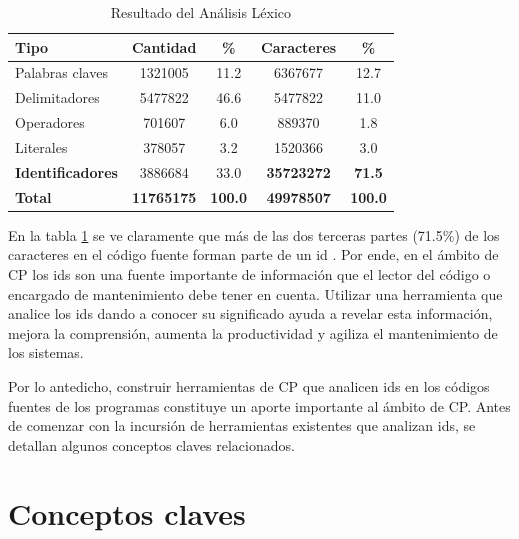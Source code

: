 \documentclass[a4paper,12pt]{report}
\begin{document}
\begin{center}
	\begin{table}[h]
	
		\centering
   		\begin{tabular}{| l | c | c | c | c | }  
       
       \hline
  	   \textsf{Tipo} & \textsf{Cantidad} & \textsf{\%} & \textsf{Caracteres} & \textsf{\%} \\ \hline
  	   Palabras claves & 1321005 & 11.2 & 6367677 & 12.7 \\ \hline
   	   Delimitadores & 5477822 & 46.6 & 5477822 & 11.0 \\ \hline
       Operadores & 701607 & 6.0 & 889370 & 1.8 \\ \hline
       Literales & 378057 & 3.2 & 1520366 & 3.0 \\ \hline          
       \textbf{Identificadores} & 3886684 & 33.0 & \textbf{35723272} & \textbf{71.5} \\ \hline
       \textbf{Total} & \textbf{11765175} & \textbf{100.0} & \textbf{49978507} & \textbf{100.0} \\ \hline
     
   	\end{tabular}  
	   
   \caption{Resultado del Análisis Léxico}
   \label{tabla1}
   
  \end{table} 
\end{center}

\vspace{-2.5em}

En la tabla \ref{tabla1} se ve claramente que más de las dos terceras partes (71.5\%) de los caracteres en el código fuente forman parte de un id \cite{DFPM05,DMDJ13}. 
Por ende, en el ámbito de CP los ids son una fuente importante de información que el lector del código o encargado de mantenimiento debe tener en cuenta. Utilizar una herramienta que analice los ids dando a conocer su significado ayuda a revelar esta información, mejora la comprensión, aumenta la productividad y agiliza el mantenimiento de los sistemas.

Por lo antedicho, construir herramientas de CP que analicen ids en los códigos fuentes de los programas constituye un aporte importante al ámbito de CP. Antes de comenzar con la incursión de herramientas existentes que analizan ids, se detallan algunos conceptos claves relacionados.

\section{Conceptos claves}
\end{document}
